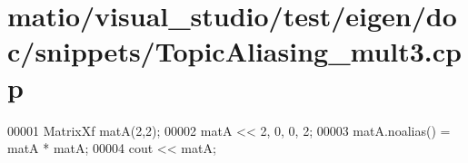 \hypertarget{matio_2visual__studio_2test_2eigen_2doc_2snippets_2_topic_aliasing__mult3_8cpp_source}{}\section{matio/visual\+\_\+studio/test/eigen/doc/snippets/\+Topic\+Aliasing\+\_\+mult3.cpp}
\label{matio_2visual__studio_2test_2eigen_2doc_2snippets_2_topic_aliasing__mult3_8cpp_source}

\begin{DoxyCode}
00001 MatrixXf matA(2,2); 
00002 matA << 2, 0,  0, 2;
00003 matA.noalias() = matA * matA;
00004 cout << matA;
\end{DoxyCode}
